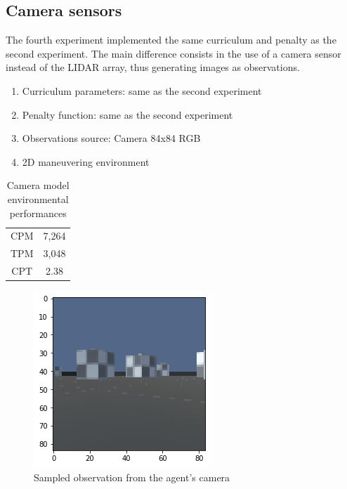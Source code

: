 \documentclass{ifacconf}
\begin{document}
\subsection{Camera sensors}
The fourth experiment implemented the same curriculum and penalty as the second experiment. The main difference consists in the use of a camera sensor instead of the LIDAR array, thus generating images as observations.
\begin{enumerate}
    \item Curriculum parameters: same as the second experiment
    \item Penalty function: same as the second experiment
    \item Observations source: Camera 84x84 RGB
    \item 2D maneuvering environment
\end{enumerate}

\begin{table}[ht]
\centering
\caption{Camera model environmental performances}
\label{tab:camera}
\begin{tabular}[t]{cc}
\hline
CPM&7,264\\
TPM&3,048\\
CPT&2.38\\
\hline
\end{tabular}
\end{table}%

\begin{figure}[!h]
\begin{center}
\includegraphics[width=\linewidth]{res/cameraview.png} 
\caption{Sampled observation from the agent's camera} 
\label{fig:semistr}
\end{center}
\end{figure}
\end{document}
